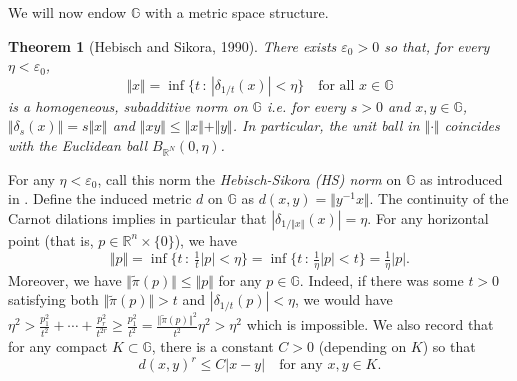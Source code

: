\documentclass[11pt]{amsart}
\newtheorem{theorem}{Theorem}
\theoremstyle{definition}
\newcommand{\G}{\mathbb G}
\numberwithin{theorem}{section} \numberwithin{equation}{section}
\begin{document}
We will now endow $\mathbb{G}$ with a metric space structure.
\begin{theorem}[Hebisch and Sikora, 1990]
\label{HSdef}
There exists $\varepsilon_0 > 0$ so that, for every $\eta < \varepsilon_0$,
$$
\Vert x \Vert 
= \inf \{ t \, : \, |\delta_{1/t}(x)| < \eta \}
\quad
\text{for all } x \in \mathbb{G}
$$
is a homogeneous, subadditive norm on $\mathbb{G}$
i.e. for every $s>0$ and $x,y \in \mathbb{G}$, $\Vert \delta_s(x) \Vert = s \Vert x \Vert$
and $\Vert xy \Vert \leq \Vert x \Vert + \Vert y \Vert$.
In particular, the unit ball in $\Vert \cdot \Vert$ coincides with the Euclidean ball $B_{\mathbb{R}^N}(0,\eta)$.
\end{theorem}

For any $\eta < \varepsilon_0$,
call this norm the \emph{Hebisch-Sikora (HS) norm} on $\mathbb{G}$ as introduced in \cite{HebSik}.
Define the induced metric $d$ on $\mathbb{G}$ as
$
d(x,y) = \Vert y^{-1}x \Vert.
$
The continuity of the Carnot dilations implies in particular that $|\delta_{1/\Vert x \Vert}(x)| = \eta$.
For any horizontal point (that is, $p \in \mathbb{R}^n \times \{0 \}$),
we have 
\begin{equation}
\label{etafoot}
\Vert p \Vert 
= \inf \{ t \, : \, \tfrac{1}{t} | p | < \eta \} 
= \inf \{ t \, : \, \tfrac{1}{\eta} | p | < t \}
= \tfrac{1}{\eta} | p |.
\end{equation}
Moreover, we have $\Vert \tilde{\pi} (p) \Vert \leq \Vert p \Vert$ for any $p \in \G$. 
Indeed,
if there was some $t>0$ satisfying both $\Vert \tilde{\pi}(p) \Vert > t$ and $|\delta_{1/t}(p)| < \eta$, %
we would have $\eta^2 > \frac{p_1^2}{t^2} + \cdots + \frac{p_r^2}{t^{2r}} \geq \frac{p_1^2}{t^2} = \frac{\Vert \tilde{\pi}(p) \Vert^2}{t^2} \eta^2 > \eta^2$ 
which is impossible.  We also record that for any compact $K \subset \mathbb{G}$,
there is a constant $C>0$ (depending on $K$) so that
\begin{equation}
\label{compact}
d(x,y)^r \leq C|x-y|
\quad 
\text{for any } x,y \in K.
\end{equation}
\end{document}
